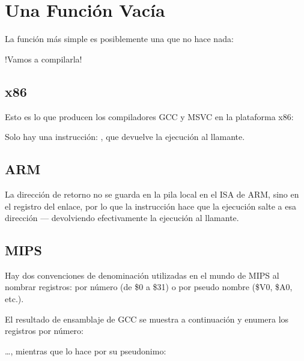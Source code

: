 \section{Una Función Vacía}
\label{empty_func}

La función más simple es posiblemente una que no hace nada:



!Vamos a compilarla!

\subsection{x86}

Esto es lo que producen los compiladores GCC y MSVC en la plataforma x86:



Solo hay una instrucción: \RET, que devuelve la ejecución al \gls {llamante}.

\subsection{ARM}



La dirección de retorno no se guarda en la pila local en el \ac{ISA} de ARM, sino en el registro del enlace, por lo que la instrucción  hace que la ejecución salte a esa dirección --- devolviendo efectivamente la ejecución al \gls{llamante}.

\subsection{MIPS}

Hay dos convenciones de denominación utilizadas en el mundo de MIPS al nombrar registros:
por número (de \$0 a \$31) o por pseudo nombre (\$V0, \$A0, etc.).

El resultado de ensamblaje de GCC se muestra a continuación y enumera los registros por número:



\dots, mientras que \IDA lo hace por su  pseudonimo:

